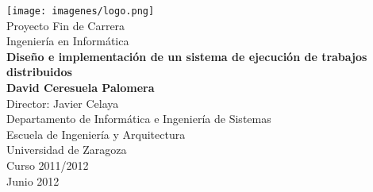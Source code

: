 \documentclass[11pt, twoside]{book}
\makeatletter
\def\cleardoublepageempty{\clearpage\if@twoside \ifodd\c@page\else
    \hbox{}
    \thispagestyle{empty}
    \newpage
    \if@twocolumn\hbox{}\newpage\fi\fi\fi}
\def\bibname{Bibliografía}
\def\listtablename{Índice de tablas}
\makeatother
\begin{document}

\renewcommand{\listtablename}{Índice de tablas}
\renewcommand{\bibname}{Bibliografía}

\begin{titlepage} 
\begin{center} 
 
\texttt{[image: imagenes/logo.png]}\\ 

\vspace*{1.5cm} 
{\large Proyecto Fin de Carrera}\\ 
\vspace*{0.2cm} 
{\large Ingeniería en Informática}\\ 
\vspace*{1.5cm} 
{\huge \textbf{Diseño e implementación de un sistema de ejecución de trabajos distribuidos\\}}
\vspace*{2cm} 
{\Large \textbf{David Ceresuela Palomera\\}}
\vspace*{2cm} 
{\normalsize Director: Javier Celaya}\\ 
\vspace*{1.5cm} 
{\normalsize Departamento de Informática e Ingeniería de Sistemas}\\ 
{Escuela de Ingeniería y Arquitectura}\\ 
{Universidad de Zaragoza}\\ 
\vspace*{3.5cm} 
{\normalsize Curso 2011/2012}\\ 
{\normalsize Junio 2012}\\ 
\end{center} 
\end{titlepage} 

\cleardoublepageempty


\frontmatter %



\tableofcontents

\mainmatter %









\nocite{*}



\appendix








\cleardoublepageempty
\end{document}
